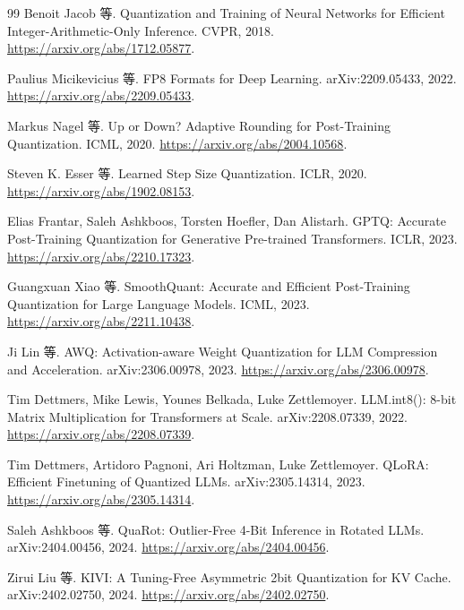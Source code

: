 \documentclass[UTF8,12pt,a4paper,fontset=fandol]{ctexart}
\begin{document}
\begin{thebibliography}{99}
Benoit Jacob 等.
Quantization and Training of Neural Networks for Efficient Integer-Arithmetic-Only Inference.
CVPR, 2018.
\url{https://arxiv.org/abs/1712.05877}.

Paulius Micikevicius 等.
FP8 Formats for Deep Learning.
arXiv:2209.05433, 2022.
\url{https://arxiv.org/abs/2209.05433}.

Markus Nagel 等.
Up or Down? Adaptive Rounding for Post-Training Quantization.
ICML, 2020.
\url{https://arxiv.org/abs/2004.10568}.

Steven K. Esser 等.
Learned Step Size Quantization.
ICLR, 2020.
\url{https://arxiv.org/abs/1902.08153}.

Elias Frantar, Saleh Ashkboos, Torsten Hoefler, Dan Alistarh.
GPTQ: Accurate Post-Training Quantization for Generative Pre-trained Transformers.
ICLR, 2023.
\url{https://arxiv.org/abs/2210.17323}.

Guangxuan Xiao 等.
SmoothQuant: Accurate and Efficient Post-Training Quantization for Large Language Models.
ICML, 2023.
\url{https://arxiv.org/abs/2211.10438}.

Ji Lin 等.
AWQ: Activation-aware Weight Quantization for LLM Compression and Acceleration.
arXiv:2306.00978, 2023.
\url{https://arxiv.org/abs/2306.00978}.

Tim Dettmers, Mike Lewis, Younes Belkada, Luke Zettlemoyer.
LLM.int8(): 8-bit Matrix Multiplication for Transformers at Scale.
arXiv:2208.07339, 2022.
\url{https://arxiv.org/abs/2208.07339}.

Tim Dettmers, Artidoro Pagnoni, Ari Holtzman, Luke Zettlemoyer.
QLoRA: Efficient Finetuning of Quantized LLMs.
arXiv:2305.14314, 2023.
\url{https://arxiv.org/abs/2305.14314}.

Saleh Ashkboos 等.
QuaRot: Outlier-Free 4-Bit Inference in Rotated LLMs.
arXiv:2404.00456, 2024.
\url{https://arxiv.org/abs/2404.00456}.

Zirui Liu 等.
KIVI: A Tuning-Free Asymmetric 2bit Quantization for KV Cache.
arXiv:2402.02750, 2024.
\url{https://arxiv.org/abs/2402.02750}.
\end{thebibliography}
\end{document}
